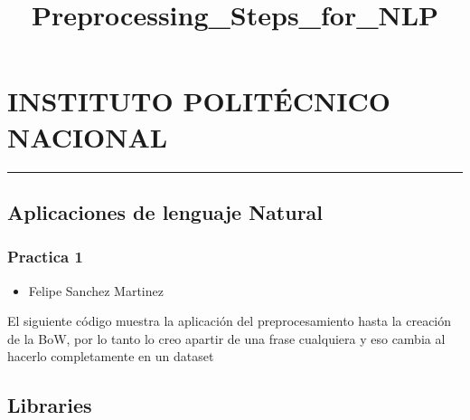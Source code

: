\documentclass[11pt]{article}
\title{Preprocessing\_Steps\_for\_NLP}
\providecommand{\tightlist}{%
      \setlength{\itemsep}{0pt}\setlength{\parskip}{0pt}}
\begin{document}
    
    \maketitle
    
    

    
    \hypertarget{instituto-polituxe9cnico-nacional}{%
\section{INSTITUTO POLITÉCNICO
NACIONAL}\label{instituto-polituxe9cnico-nacional}}

\begin{center}\rule{0.5\linewidth}{0.5pt}\end{center}

\hypertarget{aplicaciones-de-lenguaje-natural}{%
\subsection{Aplicaciones de lenguaje
Natural}\label{aplicaciones-de-lenguaje-natural}}

\hypertarget{practica-1}{%
\subsubsection{Practica 1}\label{practica-1}}

\begin{itemize}
\tightlist
\item
  Felipe Sanchez Martinez
\end{itemize}

    El siguiente código muestra la aplicación del preprocesamiento hasta la
creación de la BoW, por lo tanto lo creo apartir de una frase cualquiera
y eso cambia al hacerlo completamente en un dataset

    \hypertarget{libraries}{%
\subsection{Libraries}\label{libraries}}
\end{document}
